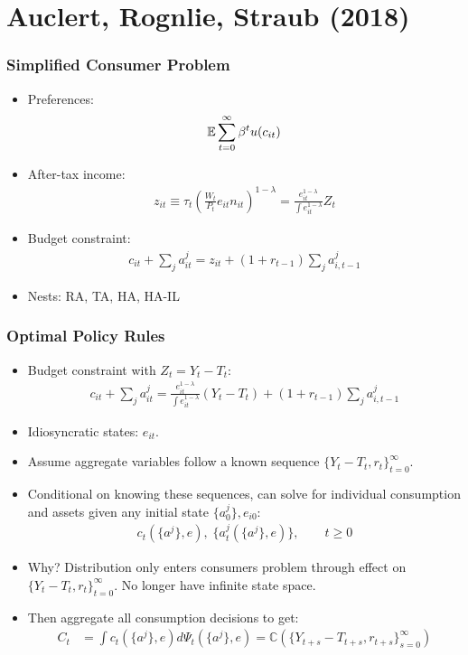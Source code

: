 \documentclass[english,xcolor=svgnames]{beamer}
\begin{document}
\section{Auclert, Rognlie, Straub (2018)}


\begin{frame}
    \frametitle{Simplified Consumer Problem}
    \begin{itemize}
        \item Preferences:
        \begin{align*}
        	\mathbb{E} \sum_{t=0}^{\infty} \beta^t u(c_{it})
        \end{align*}
        \item After-tax income: 
        \begin{align*}
        	z_{it}\equiv \tau_t \left(\frac{W_t}{P_t}e_{it}n_{it}\right)^{1-\lambda} = \frac{e_{it}^{1-\lambda}}{\int e_{it}^{1-\lambda}} Z_t
        \end{align*}
        \item Budget constraint:
        \begin{align*}
        	c_{it} + \sum_j a_{it}^j = z_{it} + (1+r_{t-1})\sum_j a_{i,t-1}^j
        \end{align*}
        \item Nests: RA, TA, HA, HA-IL
	\end{itemize}
\end{frame}


\begin{frame}
    \frametitle{Optimal Policy Rules}
    \begin{itemize}
        \item Budget constraint with $Z_t=Y_t-T_t$:
        \begin{align*}
        	c_{it} + \sum_j a_{it}^j = \frac{e_{it}^{1-\lambda}}{\int e_{it}^{1-\lambda}} (Y_t-T_t) + (1+r_{t-1})\sum_j a_{i,t-1}^j
        \end{align*}
        \item Idiosyncratic states: $e_{it}$.
        \item Assume aggregate variables follow a known sequence $\{Y_t-T_t, r_t\}_{t=0}^{\infty}$.
        \item Conditional on knowing these sequences, can solve for individual consumption and assets given any initial state $\{a_0^j\},e_{i0}$:
        \begin{align*}
        	c_t(\{a^j\},e),\;\{a_t^j(\{a^j\},e)\},\qquad t\ge 0
        \end{align*}
        \item Why? Distribution only enters consumers problem through effect on $\{Y_t-T_t, r_t\}_{t=0}^{\infty}$. No longer have infinite state space.
        \item Then aggregate all consumption decisions to get:
        \begin{align*}
            C_t &=\int c_t(\{a^j\},e) d\Psi_t(\{a^j\},e) =  \mathbb{C}(\{Y_{t+s}-T_{t+s},r_{t+s}\}_{s=0}^{\infty})
        \end{align*}
	\end{itemize}
\end{frame}
\end{document}
